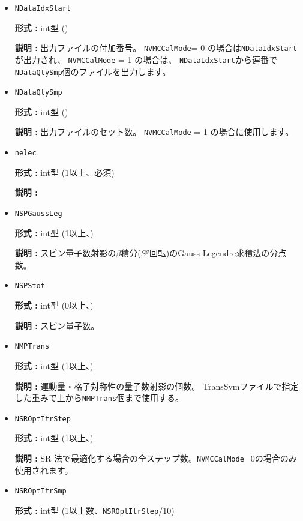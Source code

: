 \begin{itemize}
 \item  \verb|NDataIdxStart|

 {\bf 形式 :} int型 ()

{\bf 説明 :} 出力ファイルの付加番号。
\verb|NVMCCalMode|= 0 の場合は\verb|NDataIdxStart|が出力され、 
\verb|NVMCCalMode| = 1 の場合は、
\verb|NDataIdxStart|から連番で\verb|NDataQtySmp|個のファイルを出力します。
   
 \item  \verb|NDataQtySmp|

 {\bf 形式 :} int型 ()

{\bf 説明 :} 出力ファイルのセット数。 \verb|NVMCCalMode| = 1 の場合に使用します。

\item  \verb|nelec|

  {\bf 形式 :} {int型 (1以上、必須)}

  {\bf 説明 :} 

\item  \verb|NSPGaussLeg|

  {\bf 形式 :} {int型 (1以上、)}

  {\bf 説明 :} スピン量子数射影の$\beta$積分($S^y$回転)のGauss-Legendre求積法の分点数。


\item  \verb|NSPStot|

  {\bf 形式 :} int型 (0以上、)

  {\bf 説明 :}  スピン量子数。

\item  \verb|NMPTrans|

  {\bf 形式 :} int型 (1以上、)

  {\bf 説明 :} 
  運動量・格子対称性の量子数射影の個数。
  TransSymファイルで指定した重みで上から\verb|NMPTrans|個まで使用する。

 \item  \verb|NSROptItrStep|

{\bf 形式 :} int型 (1以上、)

{\bf 説明 :} 
SR 法で最適化する場合の全ステップ数。\verb|NVMCCalMode|=0の場合のみ使用されます。
 
 \item  \verb|NSROptItrSmp|

{\bf 形式 :} int型 (1以上数、\verb|NSROptItrStep|/10)


\end{itemize}
